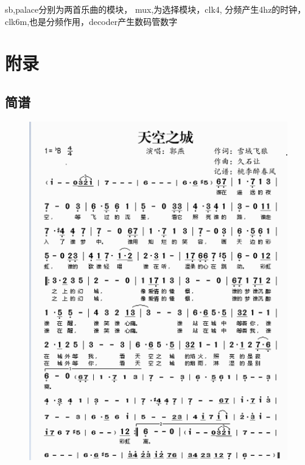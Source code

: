 \documentclass[UTF8]{ctexart}
\begin{document}
  sb,palace分别为两首乐曲的模块，  mux,为选择模块，clk4, 分频产生4hz的时钟，clk6m,也是分频作用，decoder产生数码管数字

\section{附录}

\subsection{简谱}

\begin{figure}[H]
  \centering

  \includegraphics[width=1\textwidth]{sky.png}
\end{figure}
\end{document}
